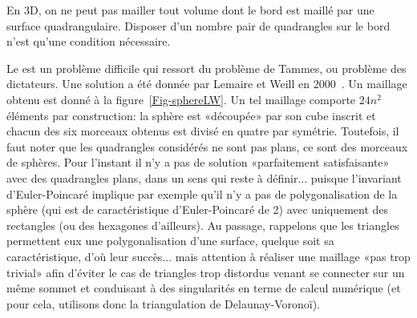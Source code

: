 En 3D, on ne peut pas mailler tout volume dont le bord est maillé par une surface quadrangulaire.
Disposer d'un nombre pair de quadrangles sur le bord n'est qu'une condition nécessaire.

Le  est un problème difficile qui ressort du problème de Tammes, ou problème des dictateurs. Une solution a été donnée par Lemaire et Weill en 2000~\cite{bib-LemW}. Un maillage obtenu est donné à la figure~\ref{Fig-sphereLW}. Un tel maillage comporte $24n^2$ éléments par construction: la sphère est «découpée» par son cube inscrit et chacun des six morceaux obtenus est divisé en quatre par symétrie. Toutefois, il faut noter que les quadrangles considérés ne sont pas plans, ce sont des morceaux de sphères. Pour l'instant il n'y a pas de solution «parfaitement satisfaisante» avec des quadrangles plans, dans un sens qui reste à définir... puisque l'invariant d'Euler-Poincaré implique par exemple qu'il n'y a pas de polygonalisation de la sphère (qui est de caractéristique d'Euler-Poincaré de 2) avec uniquement des rectangles (ou des hexagones d'ailleurs). Au passage, rappelons que les triangles permettent eux une polygonalisation d'une surface, quelque soit sa caractéristique, d'où leur succès... mais attention à réaliser une maillage «pas trop trivial» afin d'éviter le cas de triangles trop distordus venant se connecter sur un même sommet et conduisant à des singularités en terme de calcul numérique (et pour cela, utilisons donc la triangulation de Delaunay-Voronoï).

